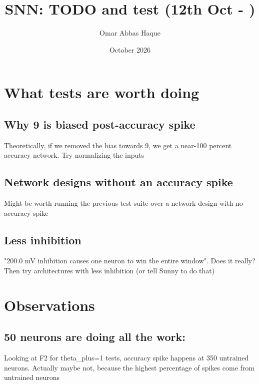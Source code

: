 \documentclass{article}
\title{SNN: TODO and test (12th Oct - )}
\author{Omar Abbas Haque}
\date{October 2026}
\begin{document}
\maketitle

\section{What tests are worth doing}

\subsection{Why 9 is biased post-accuracy spike}
Theoretically, if we removed the bias towards 9, we get a near-100 percent accuracy network. Try normalizing the inputs

\subsection{Network designs without an accuracy spike}
Might be worth running the previous test suite over a network design with no accuracy spike

\subsection{Less inhibition}
"200.0 mV inhibition causes one neuron to win the entire window". Does it really? \\
Then try architectures with less inhibition (or tell Sunny to do that)

\section{Observations}
\subsection{50 neurons are doing all the work:}
Looking at F2 for theta\_plus=1 tests, accuracy spike happens at 350 untrained neurons. Actually maybe not, because the highest percentage of spikes come from untrained neurons
\end{document}
